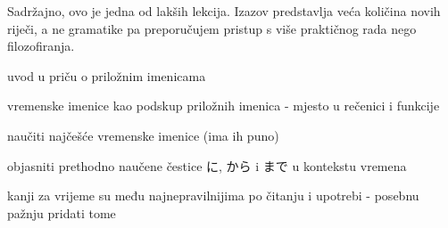 
\author{Tomislav Mamić}

	
	Sadržajno, ovo je jedna od lakših lekcija. Izazov predstavlja veća količina novih riječi, a ne gramatike pa preporučujem pristup s više praktičnog rada nego filozofiranja.
	
	
	\begin{hyou}
		\item uvod u priču o priložnim imenicama
		\item vremenske imenice kao podskup priložnih imenica - mjesto u rečenici i funkcije
		\item naučiti najčešće vremenske imenice (ima ih puno)
		\item objasniti prethodno naučene čestice に, から i まで u kontekstu vremena
	\end{hyou}

	
	\begin{hyou}
		\item kanji za vrijeme su među najnepravilnijima po čitanju i upotrebi - posebnu pažnju pridati tome
	\end{hyou}
